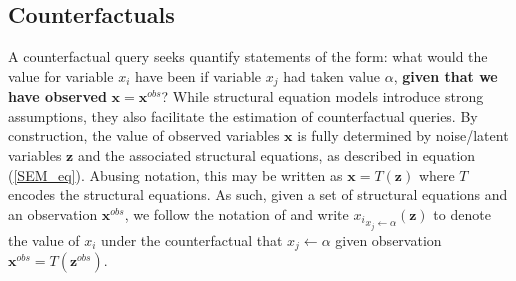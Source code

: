 \documentclass{article}
\begin{document}



\subsection*{Counterfactuals} 

A counterfactual query seeks 
quantify statements of the form: what would the value for variable $x_i$ have been if variable $x_j$ had taken 
value $\alpha$, %
 \textbf{given that we have observed} $\mathbf{x}=\mathbf{x}^{obs}$? 
While 
structural equation models introduce strong assumptions, they also 
facilitate the 
estimation of counterfactual queries. %
By construction, the value of observed variables 
$\mathbf{x}$ is fully determined by noise/latent variables $\mathbf{z}$ and the associated structural equations, as described in equation (\ref{SEM_eq}). Abusing notation, this may be written as 
$\mathbf{x} = T( \mathbf{z})$ where $T$ encodes the structural equations. 
%
As such, given a set of structural equations and an observation $\mathbf{x}^{obs}$, 
we follow the notation of \cite{Pearl2009} and write 
${x_i}_{x_j \leftarrow \alpha}(\mathbf{z})$
to denote the 
value of $x_i$ under the counterfactual that $x_j\leftarrow  \alpha$ given observation $\mathbf{x}^{obs}= T(\mathbf{z}^{obs})$. 


\end{document}

